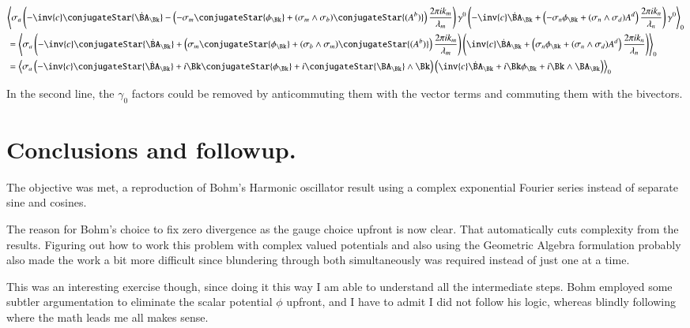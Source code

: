 \begin{align*}
&
\gpgradezero{
\sigma_a
\left( -\inv{c} \conjugateStar{\dot{\BA}_{\Bk}} - 
\left(-\sigma_m \conjugateStar{\phi_\Bk} + (\sigma_m \wedge \sigma_b) \conjugateStar{(A^b)}\right)
\frac{2 \pi i k_m}{\lambda_m} \right) 
\gamma^0
\left( -\inv{c} \dot{\BA}_\Bk + 
\left(
-\sigma_n \phi_\Bk + (\sigma_n \wedge \sigma_d) A^d\right)
\frac{2 \pi i k_n}{\lambda_n} \right) 
\gamma^0
}
\\
&=
\gpgradezero{
\sigma_a
\left( -\inv{c} \conjugateStar{\dot{\BA}_{\Bk}} + 
\left(\sigma_m \conjugateStar{\phi_\Bk} + (\sigma_b \wedge \sigma_m) \conjugateStar{(A^b)}\right)
\frac{2 \pi i k_m}{\lambda_m} \right) 
\left( \inv{c} \dot{\BA}_\Bk + 
\left(
\sigma_n \phi_\Bk + (\sigma_n \wedge \sigma_d) A^d\right)
\frac{2 \pi i k_n}{\lambda_n} \right) 
} \\
&=
\gpgradezero{
\sigma_a
\left( 
-\inv{c} \conjugateStar{\dot{\BA}_{\Bk}} 
+ i \Bk \conjugateStar{\phi_\Bk} 
+ i \conjugateStar{\BA_\Bk} \wedge \Bk
\right) 
\left( \inv{c} \dot{\BA}_\Bk + 
i \Bk \phi_\Bk 
+ i \Bk \wedge \BA_\Bk
\right)
} 
\\
\end{align*}

In the second line, the $\gamma_0$ factors could be removed by anticommuting them with the vector terms and commuting them with the bivectors.

\section{Conclusions and followup.}

The objective was met, a reproduction of Bohm's Harmonic oscillator result using a complex exponential Fourier series instead of separate sine and cosines.

The reason for Bohm's choice to fix zero divergence as the gauge choice upfront is now clear.  That automatically cuts complexity from the results.  Figuring out how to work this problem with complex valued potentials and also using the Geometric Algebra formulation probably also made the work a bit more difficult since blundering through both simultaneously was required instead of just one at a time.

This was an interesting exercise though, since doing it this way I am able to understand all the intermediate steps.  Bohm employed some subtler argumentation to eliminate the scalar potential $\phi$ upfront, and I have to admit I did not follow his logic, whereas blindly following where the math leads me all makes sense.

